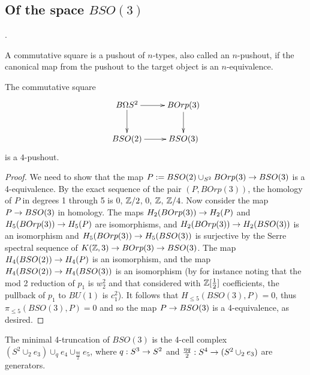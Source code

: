 \documentclass{amsart}
\begin{document}
\subsection{Of the space $BSO(3)$}.


\begin{definition}
A commutative square is a pushout of $n$-types, also called an $n$-pushout, if the canonical map from the pushout to the target object is an $n$-equivalence.
\end{definition}

\begin{proposition}
\label{s2pushout}
The commutative square
\[
\vcenter{\hbox{\xymatrix{
B\Omega S^2 \ar[r] \ar[d] & BOrp(3) \ar[d] \\
BSO(2) \ar[r] & BSO(3)
}}}
\]
is a $4$-pushout.
\end{proposition}
\begin{proof}
We need to show that the map $P := BSO(2) \cup_{S^2} BOrp(3) \rightarrow BSO(3)$ is a 4-equivalence.  By the exact sequence of the pair $(P, BOrp(3))$, the homology of $P$ in degrees 1 through 5 is $0$, $\mathbb Z/2$, $0$, $\mathbb Z$, $\mathbb Z/4$.  Now consider the map $P \rightarrow BSO(3)$ in homology.  The maps $H_2(BOrp(3)) \rightarrow H_2(P)$ and $H_5(BOrp(3)) \rightarrow H_5(P)$ are isomorphisms, and $H_2(BOrp(3)) \rightarrow H_2(BSO(3))$ is an isomorphism and $H_5(BOrp(3)) \rightarrow H_5(BSO(3))$ is surjective by the Serre spectral sequence of $K(\mathbb Z,3) \rightarrow BOrp(3) \rightarrow BSO(3)$.  The map $H_4(BSO(2)) \rightarrow H_4(P)$ is an isomorphism, and the map $H_4(BSO(2)) \rightarrow H_4(BSO(3))$ is an isomorphism (by for instance noting that the mod 2 reduction of $p_1$ is $w_2^2$ and that considered with $\mathbb Z[\frac{1}{2}]$ coefficients, the pullback of $p_1$ to $BU(1)$ is $c_1^2$).  It follows that $H_{\leq 5}(BSO(3),P) = 0$, thus $\pi_{\leq 5}(BSO(3),P) = 0$ and so the map $P \rightarrow BSO(3)$ is a 4-equivalence, as desired.
\end{proof}


\begin{corollary}
\label{cor-bso3trunc}
The minimal 4-truncation of $BSO(3)$ is the 4-cell complex $(S^2 \cup_2 e_3) \cup_q e_4 \cup_{\frac{\eta q}{2}} e_5$, where $q: S^3 \rightarrow S^2$ and $\frac{\eta q}{2}: S^4 \rightarrow (S^2 \cup_2 e_3)$ are generators.
\end{corollary}
\end{document}
